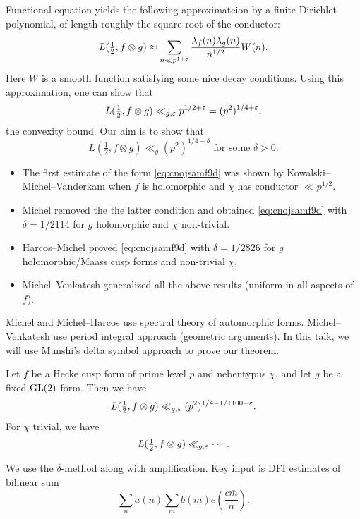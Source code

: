 \documentclass[reqno]{amsart} 
\begin{document}
Functional equation yields the following approximateion by a finite Dirichlet polynomial, of length roughly the square-root of the conductor:
\begin{equation*}
  L(\tfrac{1}{2}, f \otimes g) \approx \sum_{n \ll p^{1 + \varepsilon}}
  \frac{\lambda_f(n) \lambda_g(n)}{ n^{1/2}} W(n).
\end{equation*}
Here $W$ is a smooth function satisfying some nice decay conditions.  Using this approximation, one can show that
\begin{equation*}
  L(\tfrac{1}{2}, f \otimes g) \ll_{g, \varepsilon} p^{1/2 + \varepsilon} =
  (p^2)^{1/4 + \varepsilon},
\end{equation*}
the convexity bound.  Our aim is to show that
\begin{equation}\label{eq:cnojsamf9d}
  L(\tfrac{1}{2}, f \otimes g) \ll_g(p^2)^{1/4 - \delta} \text{ for some } \delta > 0.
\end{equation}
\begin{itemize}
\item The first estimate of the form \eqref{eq:cnojsamf9d} was shown by Kowalski--Michel--Vanderkam \cite{KMV02} when $f$ is holomorphic and $\chi$ has conductor $\ll p^{1/2}$.
\item Michel \cite{Mi04} removed the the latter condition and obtained \eqref{eq:cnojsamf9d} with $\delta = 1/2114$ for $g$ holomorphic and $\chi$ non-trivial.
\item Harcos--Michel \cite{MR2207235} proved \eqref{eq:cnojsamf9d} with $\delta = 1/2826$ for $g$ holomorphic/Maass cusp forms and non-trivial $\chi$.
\item Michel--Venkatesh \cite{michel-2009} generalized all the above results (uniform in all aspects of $f$).
\end{itemize}
Michel and Michel--Harcos use spectral theory of automorphic forms.  Michel--Venkatesh use period integral approach (geometric arguments).  In this talk, we will use Munshi's delta symbol approach to prove our theorem.

\begin{theorem}
  Let $f$ be a Hecke cusp form of prime level $p$ and nebentypus $\chi$, and let $g$ be a fixed $\operatorname{GL}(2)$ form.  Then we have
  \begin{equation*}
    L(\tfrac{1}{2}, f \otimes g) \ll_{g, \varepsilon}(p^2)^{1/4 - 1/1100 + \varepsilon}.
  \end{equation*}
  For $\chi$ trivial, we have
  \begin{equation*}
    L(\tfrac{1}{2}, f \otimes g) \ll_{g, \varepsilon} \dotsb.
  \end{equation*}
\end{theorem}
We use the $\delta$-method along with amplification.  Key input is DFI estimates of bilinear sum
\begin{equation*}
  \sum_n a(n) \sum_{m} b(m)
  e \left( \frac{c \bar{m}}{n} \right).
\end{equation*}
\end{document}
